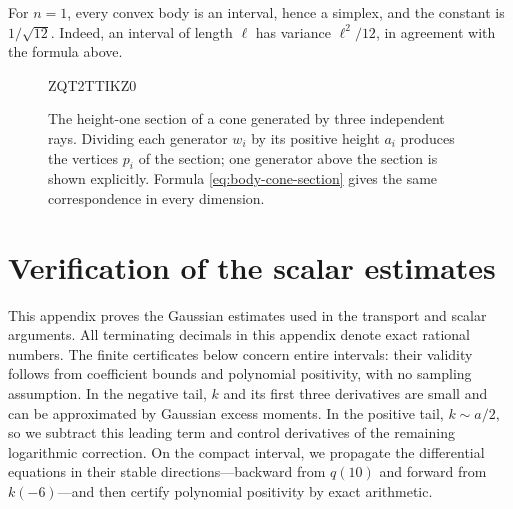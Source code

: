 \documentclass[11pt]{article}
\theoremstyle{definition}
\theoremstyle{remark}
\numberwithin{equation}{section}
\begin{document}
For $n=1$, every convex body is an interval, hence a simplex, and the
constant is $1/\sqrt{12}$.  Indeed, an interval of length $\ell$ has
variance $\ell^2/12$, in agreement with the formula above.

\begin{figure}[t]

ZQT2TTIKZ0
\caption{The height-one section of a cone generated by three independent
rays.  Dividing each generator $w_i$ by its positive height $a_i$
produces the vertices $p_i$ of the section; one generator above the
section is shown explicitly.  Formula
\eqref{eq:body-cone-section} gives the same correspondence in every
dimension.}
\label{fig:cone-section}
\end{figure}

\appendix
\section{Verification of the scalar estimates}\label{cert:verification}

This appendix proves the Gaussian estimates used in the transport and scalar
arguments. All terminating decimals in this appendix denote exact rational
numbers. The finite certificates below concern entire intervals: their
validity follows from coefficient bounds and polynomial positivity, with no
sampling assumption.
In the negative tail, $k$ and its first three derivatives are small and
can be approximated by Gaussian excess moments. In the positive tail,
$k\sim a/2$, so we subtract this leading term and control derivatives of
the remaining logarithmic correction. On the compact interval, we
propagate the differential equations in their stable directions---backward
from $q(10)$ and forward from $k(-6)$---and then certify polynomial
positivity by exact arithmetic.
\end{document}
